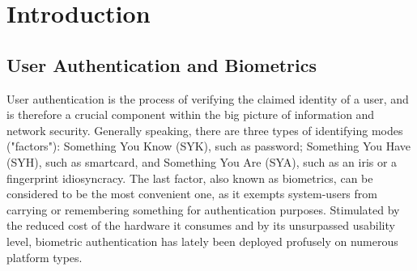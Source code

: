 
\chapter{Introduction}  %

\ifpdf
    \graphicspath{{Chapter1/Figs/Raster/}{Chapter1/Figs/PDF/}{Chapter1/Figs/}}
\else
    \graphicspath{{Chapter1/Figs/Vector/}{Chapter1/Figs/}}
\fi

\section{User Authentication and Biometrics}
\label{sec:biometricIntro}
User authentication is the process of verifying the claimed identity of a user,
and is therefore a crucial component within the big picture of information and network
security. Generally speaking, there are three types of identifying modes ("factors"):
Something You Know (SYK), such as password; Something You Have (SYH), such as
smartcard, and Something You Are (SYA), such as an iris or a fingerprint idiosyncracy. The last
factor, also known as biometrics, can be considered to be the most convenient one, as it
exempts system-users from carrying or remembering something for authentication purposes.
Stimulated by the reduced cost of the hardware it consumes and by its unsurpassed usability level, biometric authentication has lately been deployed profusely on numerous platform types.


